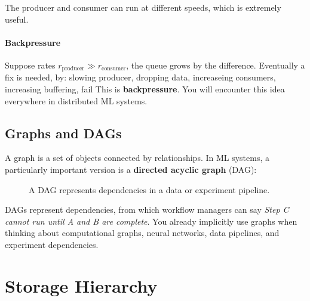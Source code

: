 The producer and consumer can run at different speeds, which is extremely useful. 

\paragraph{Backpressure}

Suppose rates $r_{\text{producer}} \gg r_{\text{consumer}}$, the queue grows by the difference.
Eventually a fix is needed, by: slowing producer, dropping data, increaseing  consumers, increasing buffering, fail
This is \textbf{backpressure}.
You will encounter this idea everywhere in distributed ML systems.

\subsection{Graphs and DAGs}
\label{subsec:graphs-dags}

A graph is a set of objects connected by relationships.
In ML systems, a particularly important version is a \textbf{directed acyclic graph} (DAG):

\begin{figure}[htbp]
\centering
{}
\caption{A DAG represents dependencies in a data or experiment pipeline.}
\label{fig:data-pipeline-dag}
\end{figure}

DAGs represent dependencies, from which workflow managers can say \textit{Step C cannot run until A and B are complete}.
You already implicitly use graphs when thinking about computational graphs, neural networks, data pipelines, and experiment dependencies.


\section{Storage Hierarchy}
\label{sec:storage-hierarchy}

